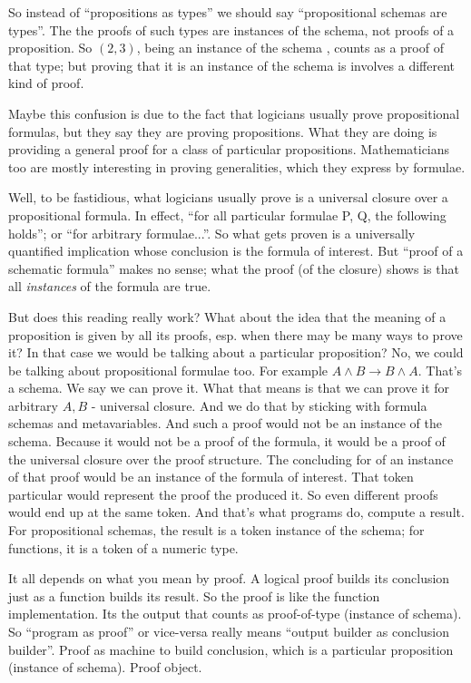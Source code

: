 \documentclass{article}
\begin{document}
So instead of ``propositions as types'' we should say ``propositional
schemas are types''. The the proofs of such types are instances of the
schema, not proofs of a proposition. So \((2,3)\), being an instance
of the schema \(\), counts as a proof of that type; but proving that
it is an instance of the schema is involves a different kind of proof.

Maybe this confusion is due to the fact that logicians usually prove
propositional formulas, but they say they are proving propositions.
What they are doing is providing a general proof for a class of
particular propositions. Mathematicians too are mostly interesting in
proving generalities, which they express by formulae.

Well, to be fastidious, what logicians usually prove is a universal
closure over a propositional formula. In effect, ``for all particular
formulae P, Q, the following holds''; or ``for arbitrary
formulae...''. So what gets proven is a universally quantified
implication whose conclusion is the formula of interest. But ``proof
of a schematic formula'' makes no sense; what the proof (of the
closure) shows is that all \textit{instances} of the formula are true.

But does this reading really work? What about the idea that the
meaning of a proposition is given by all its proofs, esp. when there
may be many ways to prove it? In that case we would be talking about a
particular proposition? No, we could be talking about propositional
formulae too. For example \(A\land B\rightarrow B\land A\). That's a
schema. We say we can prove it. What that means is that we can prove
it for arbitrary \(A, B\) - universal closure. And we do that by
sticking with formula schemas and metavariables. And such a proof
would not be an instance of the schema. Because it would not be a
proof of the formula, it would be a proof of the universal closure
over the proof structure. The concluding for of an instance of that
proof would be an instance of the formula of interest. That token
particular would represent the proof the produced it. So even
different proofs would end up at the same token. And that's what
programs do, compute a result. For propositional schemas, the result
is a token instance of the schema; for functions, it is a token of a
numeric type.

It all depends on what you mean by proof. A logical proof builds its
conclusion just as a function builds its result. So the proof is like
the function implementation. Its the output that counts as
proof-of-type (instance of schema). So ``program as proof'' or
vice-versa really means ``output builder as conclusion builder''.
Proof as machine to build conclusion, which is a particular
proposition (instance of schema). Proof object.
\end{document}
